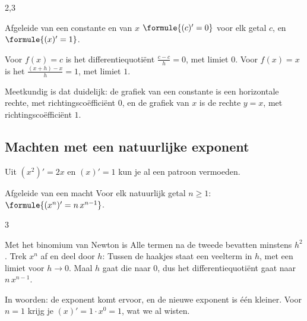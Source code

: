 \begin{alleenvoor}{2,3}
\begin{theorie}
\begin{stelling}{Afgeleide van een constante en van \texorpdfstring{$x$}{x}}
$\formule{(c)' = 0}$ voor elk getal $c$, \qquad en \qquad $\formule{(x)' = 1}$.
\end{stelling}
\begin{bewijs}
Voor $f(x) = c$ is het differentiequotiënt $\frac{c - c}{h} = 0$, met limiet $0$. Voor $f(x) = x$ is het $\frac{(x + h) - x}{h} = 1$, met limiet $1$.
\end{bewijs}
\end{theorie}

Meetkundig is dat duidelijk: de grafiek van een constante is een horizontale rechte, met richtingscoëfficiënt $0$, en de grafiek van $x$ is de rechte $y = x$, met richtingscoëfficiënt $1$.

\subsection{Machten met een natuurlijke exponent}

Uit $(x^2)' = 2x$ en $(x)' = 1$ kun je al een patroon vermoeden. 

\begin{theorie}
\begin{stelling}{Afgeleide van een macht}
Voor elk natuurlijk getal $n \geqslant 1$: \quad $\formule{(x^n)' = n\,x^{n - 1}}$.
\end{stelling}
\begin{alleenvoor}{3}
\begin{bewijs}
Met het binomium van Newton is
Alle termen na de tweede bevatten minstens $h^2$. Trek $x^n$ af en deel door $h$:
Tussen de haakjes staat een veelterm in $h$, met een limiet voor $h \to 0$. Maal $h$ gaat die naar $0$, dus het differentiequotiënt gaat naar $n\,x^{n-1}$.
\end{bewijs}
\end{alleenvoor}
\end{theorie}

In woorden: de exponent komt ervoor, en de nieuwe exponent is één kleiner. Voor $n = 1$ krijg je $(x)' = 1 \cdot x^0 = 1$, wat we al wisten.


\end{alleenvoor}
